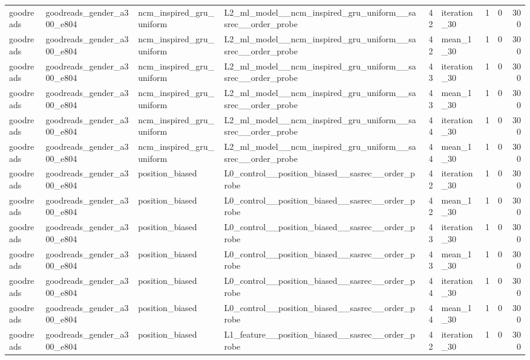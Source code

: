 \begin{table}[htbp!]
\begin{tabular}{llllrlrrr}
goodreads & goodreads\_gender\_a300\_e804 & ncm\_inspired\_gru\_uniform & L2\_ml\_model\_\_ncm\_inspired\_gru\_uniform\_\_sasrec\_\_order\_probe & 42 & iteration\_30 & 1 & 0 & 300 \\
goodreads & goodreads\_gender\_a300\_e804 & ncm\_inspired\_gru\_uniform & L2\_ml\_model\_\_ncm\_inspired\_gru\_uniform\_\_sasrec\_\_order\_probe & 42 & mean\_1\_30 & 1 & 0 & 300 \\
goodreads & goodreads\_gender\_a300\_e804 & ncm\_inspired\_gru\_uniform & L2\_ml\_model\_\_ncm\_inspired\_gru\_uniform\_\_sasrec\_\_order\_probe & 43 & iteration\_30 & 1 & 0 & 300 \\
goodreads & goodreads\_gender\_a300\_e804 & ncm\_inspired\_gru\_uniform & L2\_ml\_model\_\_ncm\_inspired\_gru\_uniform\_\_sasrec\_\_order\_probe & 43 & mean\_1\_30 & 1 & 0 & 300 \\
goodreads & goodreads\_gender\_a300\_e804 & ncm\_inspired\_gru\_uniform & L2\_ml\_model\_\_ncm\_inspired\_gru\_uniform\_\_sasrec\_\_order\_probe & 44 & iteration\_30 & 1 & 0 & 300 \\
goodreads & goodreads\_gender\_a300\_e804 & ncm\_inspired\_gru\_uniform & L2\_ml\_model\_\_ncm\_inspired\_gru\_uniform\_\_sasrec\_\_order\_probe & 44 & mean\_1\_30 & 1 & 0 & 300 \\
goodreads & goodreads\_gender\_a300\_e804 & position\_biased & L0\_control\_\_position\_biased\_\_sasrec\_\_order\_probe & 42 & iteration\_30 & 1 & 0 & 300 \\
goodreads & goodreads\_gender\_a300\_e804 & position\_biased & L0\_control\_\_position\_biased\_\_sasrec\_\_order\_probe & 42 & mean\_1\_30 & 1 & 0 & 300 \\
goodreads & goodreads\_gender\_a300\_e804 & position\_biased & L0\_control\_\_position\_biased\_\_sasrec\_\_order\_probe & 43 & iteration\_30 & 1 & 0 & 300 \\
goodreads & goodreads\_gender\_a300\_e804 & position\_biased & L0\_control\_\_position\_biased\_\_sasrec\_\_order\_probe & 43 & mean\_1\_30 & 1 & 0 & 300 \\
goodreads & goodreads\_gender\_a300\_e804 & position\_biased & L0\_control\_\_position\_biased\_\_sasrec\_\_order\_probe & 44 & iteration\_30 & 1 & 0 & 300 \\
goodreads & goodreads\_gender\_a300\_e804 & position\_biased & L0\_control\_\_position\_biased\_\_sasrec\_\_order\_probe & 44 & mean\_1\_30 & 1 & 0 & 300 \\
goodreads & goodreads\_gender\_a300\_e804 & position\_biased & L1\_feature\_\_position\_biased\_\_sasrec\_\_order\_probe & 42 & iteration\_30 & 1 & 0 & 300 \\

\end{tabular}
\end{table}
